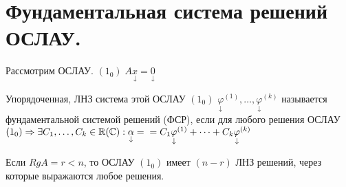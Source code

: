 \documentclass[../main.tex]{subfiles}
\begin{document}
\section{Фундаментальная система решений ОСЛАУ.}
Рассмотрим ОСЛАУ. $(1_{0}) \; A\underset{\downarrow}{x}=\underset{\downarrow}{0}$
\begin{definition}
    Упорядоченная, ЛНЗ система этой ОСЛАУ $(1_{0})$ $\underset{\downarrow}{\varphi}^{(1)},\dots,\underset{\downarrow}{\varphi}^{(k)}$ называется фундаментальной системой решений (ФСР), если для любого решения ОСЛАУ $(1_{0})\Rightarrow \exists C_{1},\dots,C_{k}\in \mathbb{R}(\mathbb{C}): \underset{\downarrow}{\alpha}=\\=C_{1}\underset{\downarrow}{\varphi}^{(1)}+\dots+C_{k}\underset{\downarrow}{\varphi}^{(k)}$
\end{definition} 
\begin{theorem}
    Если $RgA=r<n$, то ОСЛАУ $(1_{0})$ имеет $(n-r)$ ЛНЗ решений, через которые выражаются любое решения.
    
\end{theorem}
\end{document}
